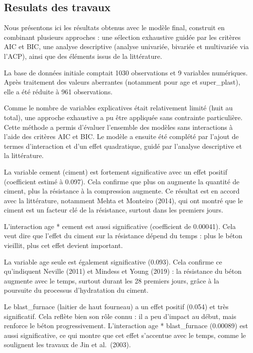 \documentclass[
  12pt,
]{article}
\begin{document}
\subsection{Resulats des travaux}\label{resulats-des-travaux}

Nous présentons ici les résultats obtenus avec le modèle final,
construit en combinant plusieurs approches : une sélection exhaustive
guidée par les critères AIC et BIC, une analyse descriptive (analyse
univariée, bivariée et multivariée via l'ACP), ainsi que des éléments
issus de la littérature.

La base de données initiale comptait 1030 observations et 9 variables
numériques. Après traitement des valeurs aberrantes (notamment pour age
et super\_plast), elle a été réduite à 961 observations.

Comme le nombre de variables explicatives était relativement limité
(huit au total), une approche exhaustive a pu être appliquée sans
contrainte particulière. Cette méthode a permis d'évaluer l'ensemble des
modèles sans interactions à l'aide des critères AIC et BIC. Le modèle a
ensuite été complété par l'ajout de termes d'interaction et d'un effet
quadratique, guidé par l'analyse descriptive et la littérature.

La variable cement (ciment) est fortement significative avec un effet
positif (coefficient estimé à 0.097). Cela confirme que plus on augmente
la quantité de ciment, plus la résistance à la compression augmente. Ce
résultat est en accord avec la littérature, notamment Mehta et Monteiro
(2014), qui ont montré que le ciment est un facteur clé de la
résistance, surtout dans les premiers jours.

L'interaction age * cement est aussi significative (coefficient de
0.00041). Cela veut dire que l'effet du ciment sur la résistance dépend
du temps : plus le béton vieillit, plus cet effet devient important.

La variable age seule est également significative (0.093). Cela confirme
ce qu'indiquent Neville (2011) et Mindess et Young (2019) : la
résistance du béton augmente avec le temps, surtout durant les 28
premiers jours, grâce à la poursuite du processus d'hydratation du
ciment.

Le blast\_furnace (laitier de haut fourneau) a un effet positif (0.054)
et très significatif. Cela reflète bien son rôle connu : il a peu
d'impact au début, mais renforce le béton progressivement. L'interaction
age * blast\_furnace (0.00089) est aussi significative, ce qui montre
que cet effet s'accentue avec le temps, comme le soulignent les travaux
de Jin et al.~(2003).
\end{document}
